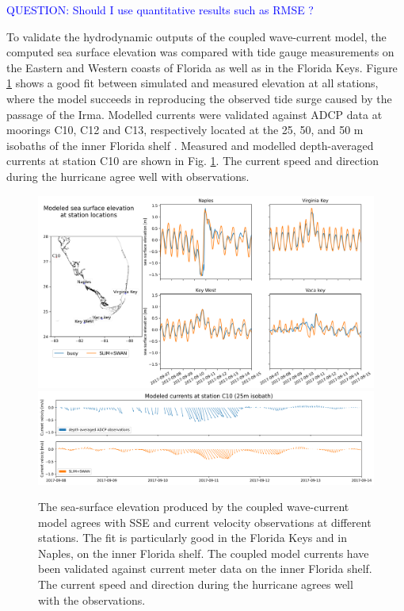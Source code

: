 \documentclass[11pt,a4paper]{article}
\begin{document}
\textcolor{blue}{QUESTION: Should I use quantitative results such as RMSE ?}

To validate the hydrodynamic outputs of the coupled wave-current model, the computed sea surface elevation was compared with tide gauge measurements on the Eastern and Western coasts of Florida as well as in the Florida Keys. Figure \ref{fig:hydro} shows a good fit between simulated and measured elevation at all stations, where the model succeeds in reproducing the observed tide surge caused by the passage of the Irma. Modelled currents were validated against ADCP data at moorings C10, C12 and C13, respectively located at the 25, 50, and 50 m isobaths of the inner Florida shelf \citep{liu2020impacts}. Measured and modelled depth-averaged currents at station C10 are shown in Fig. \ref{fig:hydro}. The current speed and direction during the hurricane agree well with observations.

\begin{figure}
    \centering
    \includegraphics[width=.95\textwidth]{fig/elevation_with_map.png}
    \includegraphics[width=.95\textwidth]{fig/validation_currents_C10_ww3.png}
    \caption{The sea-surface elevation produced by the coupled wave-current model agrees with SSE and current velocity observations at different stations. The fit is particularly good in the Florida Keys and in Naples, on the inner Florida shelf. The coupled model currents have been validated against current meter data on the inner Florida shelf. The current speed and direction during the hurricane agrees well with the observations.}
    \label{fig:hydro}
\end{figure}
\end{document}
